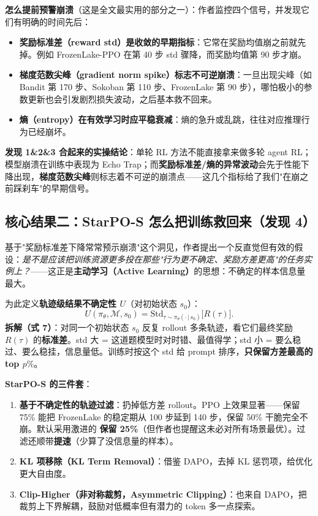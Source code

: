 \documentclass[11pt,UTF8,fontset=fandol]{ctexart}
\begin{document}
\textbf{怎么提前预警崩溃}（这是全文最实用的部分之一）：作者监控四个信号，并发现它们有明确的时间先后：
\begin{itemize}[leftmargin=1.4em,itemsep=2pt,topsep=2pt]
\item \textbf{奖励标准差（reward std）是收敛的早期指标}：它常在奖励均值崩之前就先掉。例如 FrozenLake-PPO 在第 40 步 std 骤降，而奖励均值第 90 步才崩。
\item \textbf{梯度范数尖峰（gradient norm spike）标志不可逆崩溃}：一旦出现尖峰（如 Bandit 第 170 步、Sokoban 第 110 步、FrozenLake 第 90 步），哪怕极小的参数更新也会引发剧烈损失波动，之后基本救不回来。
\item \textbf{熵（entropy）在有效学习时应平稳衰减}：熵的急升或乱跳，往往对应推理行为已经崩坏。
\end{itemize}

\begin{findbox}
\textbf{发现 1\&2\&3 合起来的实操结论}：单轮 RL 方法不能直接拿来做多轮 agent RL；模型崩溃在训练中表现为 Echo Trap；而\textbf{奖励标准差/熵的异常波动}会先于性能下降出现，\textbf{梯度范数尖峰}则标志着不可逆的崩溃点——这几个指标给了我们"在崩之前踩刹车"的早期信号。
\end{findbox}

\subsection{核心结果二：StarPO-S 怎么把训练救回来（发现 4）}

基于"奖励标准差下降常常预示崩溃"这个洞见，作者提出一个反直觉但有效的假设：\emph{是不是应该把训练资源更多投在那些"行为更不确定、奖励方差更高"的任务实例上？}——这正是\textbf{主动学习（Active Learning）}的思想：不确定的样本信息量最大。

为此定义\textbf{轨迹级结果不确定性 $U$}（对初始状态 $s_0$）：
\begin{equation*}
U(\pi_\theta,\mathcal{M},s_0)=\text{Std}_{\tau\sim\pi_\theta(\cdot\,|\,s_0)}\big[R(\tau)\big].\tag{7}
\end{equation*}
\textbf{拆解（式 7）}：对同一个初始状态 $s_0$ 反复 rollout 多条轨迹，看它们最终奖励 $R(\tau)$ 的\textbf{标准差}。std 大 = 这道题模型时对时错、最值得学；std 小 = 要么稳过、要么稳挂，信息量低。训练时按这个 std 给 prompt 排序，\textbf{只保留方差最高的 top $p\%$}。

\textbf{StarPO-S 的三件套}：
\begin{enumerate}[leftmargin=1.6em,itemsep=2pt,topsep=2pt]
\item \textbf{基于不确定性的轨迹过滤}：扔掉低方差 rollout。PPO 上效果显著——保留 75\% 能把 FrozenLake 的稳定期从 100 步延到 140 步，保留 50\% 干脆完全不崩。默认采用激进的 \textbf{保留 25\%}（但作者也提醒这未必对所有场景最优）。过滤还顺带\textbf{提速}（少算了没信息量的样本）。
\item \textbf{KL 项移除（KL Term Removal）}：借鉴 DAPO，去掉 KL 惩罚项，给优化更大自由度。
\item \textbf{Clip-Higher（非对称裁剪，Asymmetric Clipping）}：也来自 DAPO，把裁剪上下界解耦，鼓励对低概率但有潜力的 token 多一点探索。
\end{enumerate}
\end{document}
